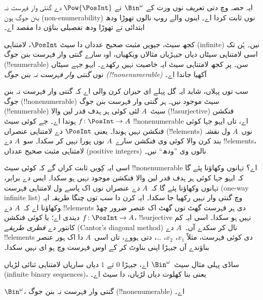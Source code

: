 \documentclass[../../../include/open-logic-section]{subfiles}
\begin{document}


\begin{editorial}
  ایہ حصہ  وچ دتی تعریف نوں ورت کے $\Bin^\omega$ تے
  $\Pow{\PosInt}$ دے گنتی وار فہرست نہ بنن جوگ ہون (non-enumerability)
  نوں ثابت کردا اے۔
  اینوں  والے روپ نالوں تھوڑا ودھ ابتدائی تے تھوڑا
  ودھ تفصیلی بناؤن دا مقصد اے۔
\end{editorial}

کجھ سیٹ، جیویں مثبت صحیح عدداں دا سیٹ $\PosInt$، لامتناہی (infinite)
نیں۔ ہُن تک اسی لامتناہی سیٹاں دیاں جیہڑیاں مثالاں ویکھیاں، اوہ سارے
گنتی وار فہرست بنن جوگ (!!{enumerable}) سن۔ پر کجھ لامتناہی سیٹ ایہ
خاصیت نہیں رکھدے۔ ایہو جہے سیٹاں نوں \emph{گنتی وار فہرست نہ بنن جوگ
(!!{nonenumerable})} آکھیا جاندا اے۔

سب توں پہلاں، شاید ایہ گل پہلے ای حیران کرن والی اے کہ
گنتی وار فہرست نہ بنن جوگ (!!{nonenumerable}) سیٹ موجود نیں۔ ہر گنتی
وار فہرست بنن جوگ (!!{enumerable}) سیٹ~$A$ لئی کوئی ہر ہدف قدر لین
والا (!!a{surjective}) فنکشن $f \colon \PosInt \to A$ ہوندا اے۔ جے
کوئی سیٹ !!{nonenumerable} اے، تاں ایہو جہا کوئی فنکشن نہیں ہوندا۔ یعنی
$\PosInt$ دے لامتناہی عنصراں (!!{element}s) نوں~$A$ ول نقشہ بند کرن
والا کوئی وی فنکشن سارے~$A$ نوں پورا نہیں کر سکدا۔ سو~$A$ دے
!!{element}s، لامتناہی مثبت صحیح عدداں (positive integers) نالوں وی
”ودھ“ نیں۔

اسی ایہ کِویں ثابت کراں گے کہ کوئی سیٹ !!{nonenumerable} اے؟ تہانوں
وکھاؤنا پئے گا کہ ایہو جہا کوئی ہر ہدف قدر لین والا فنکشن موجود نہیں
ہو سکدا۔ ایس دے برابر، تہانوں وکھاؤنا پئے گا کہ~$A$ دے عنصراں نوں اک
پاسے ول لامتناہی فہرست (one-way infinite list) وچ گنتی وار نہیں رکھیا
جا سکدا۔ ایہ کرن دا سب
توں چنگا طریقہ ایہ وکھاؤنا اے کہ~$A$ دے !!{element}s دی ہر فہرست
گھٹ توں گھٹ اک عنصر ضرور چھڈ دیندی اے؛ یا کوئی فنکشن
$f\colon \PosInt \to A$، !!{surjective} نہیں ہو سکدا۔ اسی ایہ کم
کانتور دے \emph{قطری طریقے} (Cantor's diagonal method) نال کر سکدے
آں۔~$A$ دے !!{element}s دی
کوئی فہرست، مثلاً $x_1$، $x_2$، \dots، دتی ہووے، تاں اسی~$A$ دا اک
ہور عنصر بناؤندے آں جیہڑا اپنی بناوٹ کر کے اوس فہرست وچ ہو ای نہیں سکدا۔

ساڈی پہلی مثال سیٹ~$\Bin^\omega$ اے، جیہڑا $0$ تے $1$ دیاں ساریاں
لامتناہی ثنائی لڑیاں (infinite binary sequences)، یعنی بنا کھلوت دیاں
لڑیاں، دا سیٹ اے۔

\begin{thm}
$\Bin^\omega$، گنتی وار فہرست نہ بنن جوگ (!!{nonenumerable}) اے۔
\end{thm}
\end{document}
